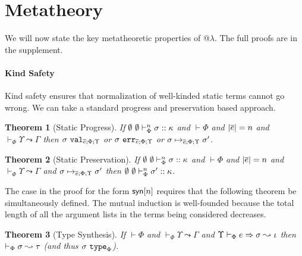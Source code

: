 \documentclass[10pt,preprint]{sigplanconf}
\newtheorem{theorem}{Theorem}
\newtheorem{lemma}{Lemma}
\begin{document}


\section{Metatheory}\label{metatheory}
We will now state the key metatheoretic properties of @$\lambda$. The full proofs are in the supplement. 

\paragraph{Kind Safety} Kind safety ensures that normalization of well-kinded static terms cannot go wrong. We can take a standard progress and preservation based approach. 
\begin{theorem}[Static Progress]
If $\emptyset~\emptyset \vdash_{\Phi}^{n} \sigma :: \kappa$ and $\vdash \Phi$ and $|\overline{e}|=n$ and $\vdash_\Phi \Upsilon \leadsto \Gamma$ then $\sigma~\mathtt{val}_{\overline{e}; \Phi; \Upsilon}$ or $\sigma~\mathtt{err}_{\overline{e}; \Phi; \Upsilon}$ or $\sigma \mapsto_{\overline{e}; \Phi; \Upsilon} \sigma'$.
\end{theorem}

\begin{theorem}[Static Preservation]
If $\emptyset~\emptyset \vdash_{\Phi}^{n} \sigma :: \kappa$ and $\vdash \Phi$ and $|\overline{e}|=n$ and $\vdash_\Phi \Upsilon \leadsto \Gamma$ and $\sigma \mapsto_{\overline{e}; \Phi; \Upsilon} \sigma'$ then $\emptyset~\emptyset \vdash_{\Phi}^{n} \sigma' :: \kappa$.
\end{theorem}
The case in the proof for the form ${\sf syn}[n]$ requires that the following theorem be simultaneously defined. The mutual induction is well-founded because the total length of all the argument lists in the terms being considered decreases.
\begin{theorem}[Type Synthesis]
If $\vdash \Phi$ and $\vdash_\Phi \Upsilon \leadsto \Gamma$ and $\Upsilon \vdash_{\Phi} e \Rightarrow \sigma \leadsto \iota$ then $\vdash_\Phi \sigma \leadsto \tau$ (and thus $\sigma~\texttt{type}_{\Phi}$). 
\end{theorem}
\end{document}

